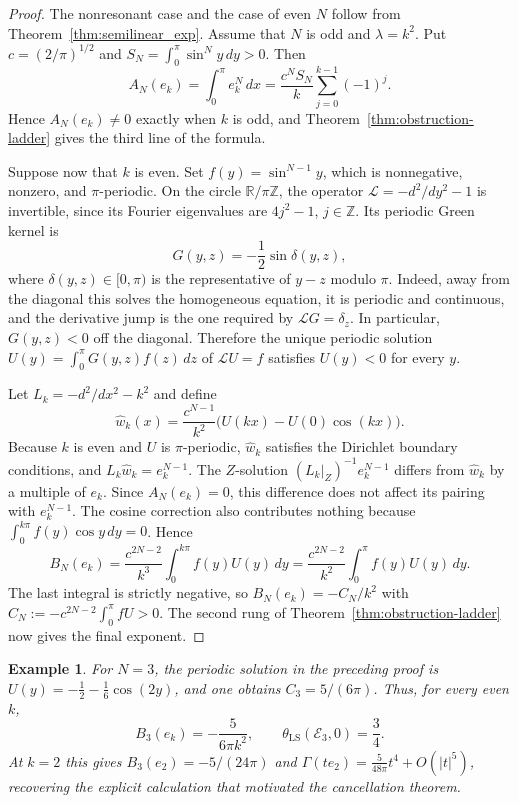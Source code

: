 \documentclass[11pt]{article}
\newtheorem{example}[theorem]{Example}
\theoremstyle{definition}
\theoremstyle{remark}
\begin{document}
\begin{proof}
The nonresonant case and the case of even $N$ follow from Theorem~\ref{thm:semilinear_exp}. Assume that $N$ is odd and $\lambda=k^2$. Put $c=(2/\pi)^{1/2}$ and $S_N=\int_0^\pi\sin^N y\,dy>0$. Then
$$
A_N(e_k)=\int_0^\pi e_k^N\,dx
=\frac{c^N S_N}{k}\sum_{j=0}^{k-1}(-1)^j.
$$
Hence $A_N(e_k)\ne0$ exactly when $k$ is odd, and Theorem~\ref{thm:obstruction-ladder} gives the third line of the formula.

Suppose now that $k$ is even. Set $f(y)=\sin^{N-1}y$, which is nonnegative, nonzero, and $\pi$-periodic. On the circle $\mathbb R/\pi\mathbb Z$, the operator $\mathcal L=-d^2/dy^2-1$ is invertible, since its Fourier eigenvalues are $4j^2-1$, $j\in\mathbb Z$. Its periodic Green kernel is
$$
G(y,z)=-\frac12\sin\delta(y,z),
$$
where $\delta(y,z)\in[0,\pi)$ is the representative of $y-z$ modulo $\pi$. Indeed, away from the diagonal this solves the homogeneous equation, it is periodic and continuous, and the derivative jump is the one required by $\mathcal LG=\delta_z$. In particular, $G(y,z)<0$ off the diagonal. Therefore the unique periodic solution
$U(y)=\int_0^\pi G(y,z)f(z)\,dz$ of $\mathcal LU=f$ satisfies $U(y)<0$ for every $y$.

Let $L_k=-d^2/dx^2-k^2$ and define
$$
\widehat w_k(x)=\frac{c^{N-1}}{k^2}\bigl(U(kx)-U(0)\cos(kx)\bigr).
$$
Because $k$ is even and $U$ is $\pi$-periodic, $\widehat w_k$ satisfies the Dirichlet boundary conditions, and $L_k\widehat w_k=e_k^{N-1}$. The $Z$-solution $(L_k|_Z)^{-1}e_k^{N-1}$ differs from $\widehat w_k$ by a multiple of $e_k$. Since $A_N(e_k)=0$, this difference does not affect its pairing with $e_k^{N-1}$. The cosine correction also contributes nothing because $\int_0^{k\pi}f(y)\cos y\,dy=0$. Hence
$$
B_N(e_k)
=\frac{c^{2N-2}}{k^3}\int_0^{k\pi}f(y)U(y)\,dy
=\frac{c^{2N-2}}{k^2}\int_0^\pi f(y)U(y)\,dy.
$$
The last integral is strictly negative, so $B_N(e_k)=-C_N/k^2$ with
$C_N:=-c^{2N-2}\int_0^\pi fU>0$. The second rung of Theorem~\ref{thm:obstruction-ladder} now gives the final exponent.
\end{proof}

\begin{example}\label{ex:cubic-cancellation}
For $N=3$, the periodic solution in the preceding proof is $U(y)=-\frac12-\frac16\cos(2y)$, and one obtains $C_3=5/(6\pi)$. Thus, for every even $k$,
$$
B_3(e_k)=-\frac{5}{6\pi k^2},
\qquad
\theta_{\mathrm{LS}}(\mathcal E_3,0)=\frac34.
$$
At $k=2$ this gives $B_3(e_2)=-5/(24\pi)$ and
$\Gamma(te_2)=\frac{5}{48\pi}t^4+O(|t|^5)$, recovering the explicit calculation that motivated the cancellation theorem.
\end{example}
\end{document}
